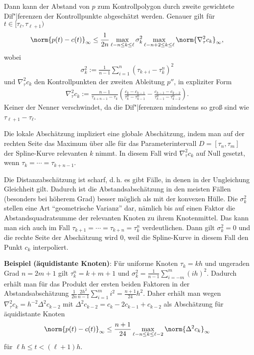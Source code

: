 Dann kann der Abstand von $p$ zum Kontrollpolygon durch zweite gewichtete Dif"|ferenzen
der Kontrollpunkte abgeschätzt werden.
Genauer gilt für $t \in [\tau_\ell, \tau_{\ell+1})$
\begin{align*}
    \norm{p(t) - c(t)}_\infty \le \frac{1}{2n} \max_{\ell-n \le k \le \ell} \sigma_k^2
    \max_{\ell-n+2 \le k \le \ell} \norm{\nabla_\tau^2 c_k}_\infty,
\end{align*}
wobei
\begin{align*}
    \sigma_k^2 := \frac{1}{n - 1} \sum_{i=1}^n (\tau_{k+i} - \tau_k^n)^2
\end{align*}
und $\nabla_\tau^2 c_k$ den Kontrollpunkten der zweiten Ableitung $p''$, in expliziter Form
\begin{align*}
    \nabla_\tau^2 c_k := \frac{n - 1}{\tau_{k+n-1} - \tau_k}
    \left(\frac{c_k - c_{k-1}}{\tau_k^n - \tau_{k-1}^n} -
    \frac{c_{k-1} - c_{k-2}}{\tau_{k-1}^n - \tau_{k-2}^n}\right).
\end{align*}
Keiner der Nenner verschwindet, da die Dif"|ferenzen mindestens so groß sind wie
$\tau_{\ell+1} - \tau_\ell$.

Die lokale Abschätzung impliziert eine globale Abschätzung, indem man auf der rechten Seite
das Maximum über alle für das Parameterintervall $D = [\tau_n, \tau_m]$ der Spline-Kurve
relevanten $k$ nimmt.
In diesem Fall wird $\nabla_\tau^2 c_k$ auf Null gesetzt, wenn $\tau_k = \dotsb = \tau_{k+n-1}$.

Die Distanzabschätzung ist scharf, d.\,h. es gibt Fälle, in denen in der Ungleichung Gleichheit
gilt.
Dadurch ist die Abstandsabschätzung in den meisten Fällen (besonders bei höherem Grad)
besser möglich als mit der konvexen Hülle.
Die $\sigma_k^2$ stellen eine Art "`geometrische Varianz"' dar,
nämlich bis auf einen Faktor die Abstandsquadratsumme der relevanten Knoten zu ihrem Knotenmittel.
Das kann man sich auch im Fall $\tau_{k+1} = \dotsb = \tau_{k+n} = \tau_k^n$ verdeutlichen.
Dann gilt $\sigma_k^2 = 0$ und die rechte Seite der Abschätzung wird $0$,
weil die Spline-Kurve in diesem Fall den Punkt $c_k$ interpoliert.

\linie

\textbf{Beispiel (äquidistante Knoten)}:
Für uniforme Knoten $\tau_k = kh$ und ungeraden Grad $n = 2m + 1$
gilt $\tau_k^n = k + m + 1$ und $\sigma_k^2 =  \frac{1}{n - 1} \sum_{i=-m}^m (ih)^2$.
Dadurch erhält man für das Produkt der ersten beiden Faktoren in der Abstandsabschätzung
$\frac{1}{2n} \frac{2h^2}{n - 1} \sum_{i=1}^m i^2 = \frac{n + 1}{24} h^2$.
Daher erhält man wegen $\nabla_\tau^2 c_k = h^{-2} \Delta^2 c_{k-2}$ mit
$\Delta^2 c_{k-2} = c_k - 2c_{k-1} + c_{k-2}$
als Abschätzung für äquidistante Knoten
\begin{align*}
    \norm{p(t) - c(t)}_\infty \le \frac{n + 1}{24} \max_{\ell-n \le k \le \ell-2}
    \norm{\Delta^2 c_k}_\infty
\end{align*}
für $\ell h \le t < (\ell + 1)h$.

